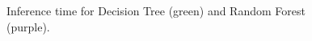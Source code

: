 \documentclass{article}
\begin{document}
  \begin{figure}
    \centering
    
    \caption{Inference time for Decision Tree (green) and Random Forest (purple).}
  \end{figure}
\end{document}
